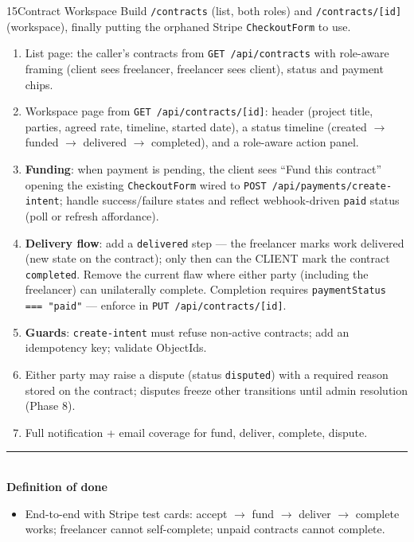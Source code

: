 \documentclass[11pt,a4paper]{article}
\newcommand{\dod}{\medskip\noindent\textcolor{donegreen}{\rule{\linewidth}{0.5pt}}\\[1mm]\textbf{\textcolor{donegreen}{Definition of done}}\\[-2mm]}
\begin{document}
\begin{promptbox}{15}{Contract Workspace}
Build \texttt{/contracts} (list, both roles) and \texttt{/contracts/[id]} (workspace),
finally putting the orphaned Stripe \texttt{CheckoutForm} to use.

\begin{enumerate}[leftmargin=1.6em]
  \item List page: the caller's contracts from \texttt{GET /api/contracts} with
        role-aware framing (client sees freelancer, freelancer sees client), status
        and payment chips.
  \item Workspace page from \texttt{GET /api/contracts/[id]}: header (project title,
        parties, agreed rate, timeline, started date), a status timeline
        (created $\rightarrow$ funded $\rightarrow$ delivered $\rightarrow$ completed),
        and a role-aware action panel.
  \item \textbf{Funding}: when payment is pending, the client sees ``Fund this
        contract'' opening the existing \texttt{CheckoutForm} wired to
        \texttt{POST /api/payments/create-intent}; handle success/failure states and
        reflect webhook-driven \texttt{paid} status (poll or refresh affordance).
  \item \textbf{Delivery flow}: add a \texttt{delivered} step --- the freelancer marks
        work delivered (new state on the contract); only then can the CLIENT mark the
        contract \texttt{completed}. Remove the current flaw where either party
        (including the freelancer) can unilaterally complete. Completion requires
        \texttt{paymentStatus === "paid"} --- enforce in
        \texttt{PUT /api/contracts/[id]}.
  \item \textbf{Guards}: \texttt{create-intent} must refuse non-active contracts;
        add an idempotency key; validate ObjectIds.
  \item Either party may raise a dispute (status \texttt{disputed}) with a required
        reason stored on the contract; disputes freeze other transitions until admin
        resolution (Phase 8).
  \item Full notification + email coverage for fund, deliver, complete, dispute.
\end{enumerate}

\dod
\begin{itemize}[leftmargin=1.6em]
  \item End-to-end with Stripe test cards: accept $\rightarrow$ fund $\rightarrow$
        deliver $\rightarrow$ complete works; freelancer cannot self-complete;
        unpaid contracts cannot complete.
\end{itemize}
\end{promptbox}
\end{document}
